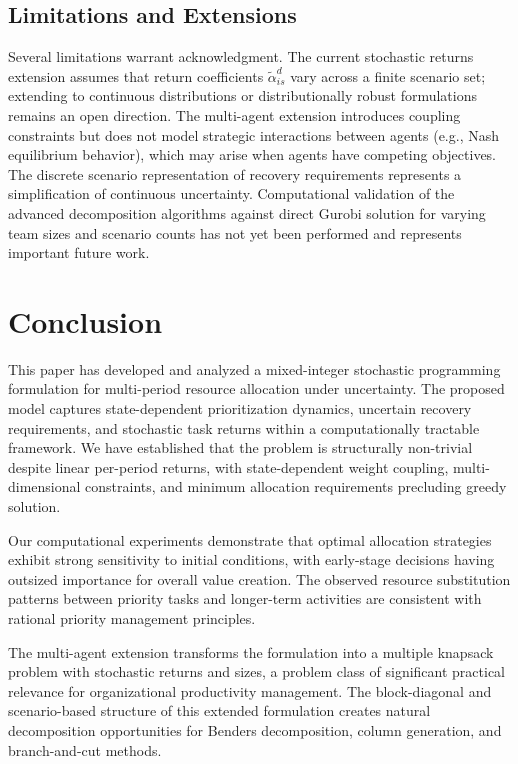 \documentclass[preprint,review,11pt]{elsarticle}
\begin{document}
\subsection{Limitations and Extensions}

Several limitations warrant acknowledgment. The current stochastic returns extension assumes that return coefficients $\tilde{\alpha}_{is}^d$ vary across a finite scenario set; extending to continuous distributions or distributionally robust formulations remains an open direction. The multi-agent extension introduces coupling constraints but does not model strategic interactions between agents (e.g., Nash equilibrium behavior), which may arise when agents have competing objectives. The discrete scenario representation of recovery requirements represents a simplification of continuous uncertainty. Computational validation of the advanced decomposition algorithms against direct Gurobi solution for varying team sizes and scenario counts has not yet been performed and represents important future work.

\section{Conclusion}\label{sec:conclusion}

This paper has developed and analyzed a mixed-integer stochastic programming formulation for multi-period resource allocation under uncertainty. The proposed model captures state-dependent prioritization dynamics, uncertain recovery requirements, and stochastic task returns within a computationally tractable framework. We have established that the problem is structurally non-trivial despite linear per-period returns, with state-dependent weight coupling, multi-dimensional constraints, and minimum allocation requirements precluding greedy solution.

Our computational experiments demonstrate that optimal allocation strategies exhibit strong sensitivity to initial conditions, with early-stage decisions having outsized importance for overall value creation. The observed resource substitution patterns between priority tasks and longer-term activities are consistent with rational priority management principles.

The multi-agent extension transforms the formulation into a multiple knapsack problem with stochastic returns and sizes, a problem class of significant practical relevance for organizational productivity management. The block-diagonal and scenario-based structure of this extended formulation creates natural decomposition opportunities for Benders decomposition, column generation, and branch-and-cut methods.
\end{document}
